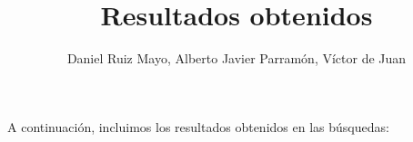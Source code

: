 \documentclass[palatino]{apuntes}
\title{Resultados obtenidos}
\author{Daniel Ruiz Mayo, Alberto Javier Parramón, Víctor de Juan}
\date{}
\begin{document}
\pagestyle{plain}
\maketitle

A continuación, incluimos los resultados obtenidos en las búsquedas:



\appendix
\end{document}
